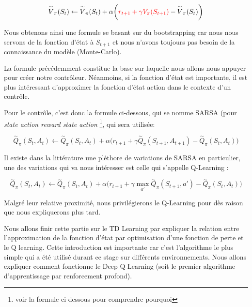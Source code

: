 \begin{equation}
\overset{\sim}{V}_{\pi}(S_t) \leftarrow \overset{\sim}{V}_{\pi}(S_t) + \alpha \bigg(\textcolor{red}{r_{t+1} + \gamma V_{\pi}(S_{t+1})} - \overset{\sim}{V}_{\pi}(S_t)\bigg)
\end{equation}

Nous obtenons ainsi une formule se basant sur du bootstrapping car nous nous servons de la fonction d'état à $S_{t+1}$ et nous n'avons toujours pas besoin de la connaissance du modèle (Monte-Carlo).

La formule précédemment constitue la base sur laquelle nous allons nous appuyer pour créer notre contrôleur. Néanmoins, si la fonction d'état est importante, il est plus intéressant d'approximer la fonction d'état action dans le contexte d'un contrôle.

Pour le contrôle, c'est donc la formule ci-dessous, qui se nomme SARSA (pour \emph{state action reward state action} \footnote{voir la formule ci-dessous pour comprendre pourquoi}, qui sera utilisée:

\begin{equation}
\overset{\sim}{Q}_{\pi}(S_t, A_t) \leftarrow \overset{\sim}{Q}_{\pi}(S_t, A_t) + \alpha \bigg(r_{t+1} + \gamma \overset{\sim}{Q}_{\pi}(S_{t+1}, A_{t+1}) - \overset{\sim}{Q}_{\pi}(S_t, A_t)\bigg)
\end{equation}

Il existe dans la littérature une pléthore de variations de SARSA en particulier, une des variations qui va nous intéresser est celle qui s'appelle Q-Learning \cite{Watkins92q-learning}: 

\begin{equation}
\overset{\sim}{Q}_{\pi}(S_t, A_t) \leftarrow \overset{\sim}{Q}_{\pi}(S_t, A_t) + \alpha \bigg(r_{t+1} + \gamma \underset{a'}{\max}\overset{\sim}{Q}_{\pi}(S_{t+1}, a') - \overset{\sim}{Q}_{\pi}(S_t, A_t)\bigg)
\end{equation}

Malgré leur relative proximité, nous privilégierons le Q-Learning pour dès raison que nous expliquerons plus tard. 

Nous allons finir cette partie sur le TD Learning par expliquer la relation entre l'approximation de la fonction d'état par optimisation d'une fonction de perte et le Q learning. Cette introduction est importante car c'est l'algorithme le plus simple qui a été utilisé durant ce stage sur différents environnements. Nous allons expliquer comment fonctionne le Deep Q Learning \cite{2013arXiv1312.5602M} \cite{mnih-dqn-2015} (soit le premier algorithme d'apprentissage par renforcement profond). 

